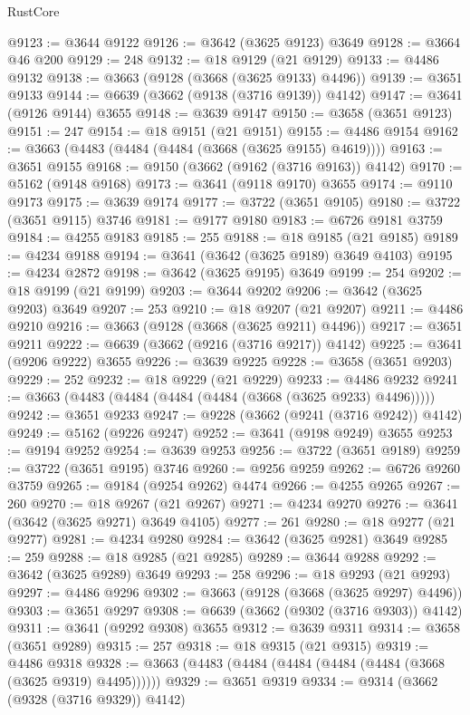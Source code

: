 \begin{lexlean}{RustCore}
\begin{coremodule}
@9123 := @3644 @9122
@9126 := @3642 (@3625 @9123) @3649
@9128 := @3664 @46 @200
@9129 := 248
@9132 := @18 @9129 (@21 @9129)
@9133 := @4486 @9132
@9138 := @3663 (@9128 (@3668 (@3625 @9133) @4496))
@9139 := @3651 @9133
@9144 := @6639 (@3662 (@9138 (@3716 @9139)) @4142)
@9147 := @3641 (@9126 @9144) @3655
@9148 := @3639 @9147
@9150 := @3658 (@3651 @9123)
@9151 := 247
@9154 := @18 @9151 (@21 @9151)
@9155 := @4486 @9154
@9162 := @3663 (@4483 (@4484 (@4484 (@3668 (@3625 @9155) @4619))))
@9163 := @3651 @9155
@9168 := @9150 (@3662 (@9162 (@3716 @9163)) @4142)
@9170 := @5162 (@9148 @9168)
@9173 := @3641 (@9118 @9170) @3655
@9174 := @9110 @9173
@9175 := @3639 @9174
@9177 := @3722 (@3651 @9105)
@9180 := @3722 (@3651 @9115) @3746
@9181 := @9177 @9180
@9183 := @6726 @9181 @3759
@9184 := @4255 @9183
@9185 := 255
@9188 := @18 @9185 (@21 @9185)
@9189 := @4234 @9188
@9194 := @3641 (@3642 (@3625 @9189) @3649 @4103)
@9195 := @4234 @2872
@9198 := @3642 (@3625 @9195) @3649
@9199 := 254
@9202 := @18 @9199 (@21 @9199)
@9203 := @3644 @9202
@9206 := @3642 (@3625 @9203) @3649
@9207 := 253
@9210 := @18 @9207 (@21 @9207)
@9211 := @4486 @9210
@9216 := @3663 (@9128 (@3668 (@3625 @9211) @4496))
@9217 := @3651 @9211
@9222 := @6639 (@3662 (@9216 (@3716 @9217)) @4142)
@9225 := @3641 (@9206 @9222) @3655
@9226 := @3639 @9225
@9228 := @3658 (@3651 @9203)
@9229 := 252
@9232 := @18 @9229 (@21 @9229)
@9233 := @4486 @9232
@9241 := @3663 (@4483 (@4484 (@4484 (@4484 (@3668 (@3625 @9233) @4496)))))
@9242 := @3651 @9233
@9247 := @9228 (@3662 (@9241 (@3716 @9242)) @4142)
@9249 := @5162 (@9226 @9247)
@9252 := @3641 (@9198 @9249) @3655
@9253 := @9194 @9252
@9254 := @3639 @9253
@9256 := @3722 (@3651 @9189)
@9259 := @3722 (@3651 @9195) @3746
@9260 := @9256 @9259
@9262 := @6726 @9260 @3759
@9265 := @9184 (@9254 @9262) @4474
@9266 := @4255 @9265
@9267 := 260
@9270 := @18 @9267 (@21 @9267)
@9271 := @4234 @9270
@9276 := @3641 (@3642 (@3625 @9271) @3649 @4105)
@9277 := 261
@9280 := @18 @9277 (@21 @9277)
@9281 := @4234 @9280
@9284 := @3642 (@3625 @9281) @3649
@9285 := 259
@9288 := @18 @9285 (@21 @9285)
@9289 := @3644 @9288
@9292 := @3642 (@3625 @9289) @3649
@9293 := 258
@9296 := @18 @9293 (@21 @9293)
@9297 := @4486 @9296
@9302 := @3663 (@9128 (@3668 (@3625 @9297) @4496))
@9303 := @3651 @9297
@9308 := @6639 (@3662 (@9302 (@3716 @9303)) @4142)
@9311 := @3641 (@9292 @9308) @3655
@9312 := @3639 @9311
@9314 := @3658 (@3651 @9289)
@9315 := 257
@9318 := @18 @9315 (@21 @9315)
@9319 := @4486 @9318
@9328 := @3663 (@4483 (@4484 (@4484 (@4484 (@4484 (@3668 (@3625 @9319) @4495))))))
@9329 := @3651 @9319
@9334 := @9314 (@3662 (@9328 (@3716 @9329)) @4142)

\end{coremodule}
\end{lexlean}
